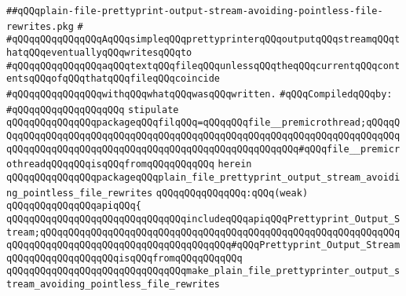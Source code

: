 \label{src/lib/prettyprint/big/src/out/plain-file-prettyprint-output-stream-avoiding-pointless-file-rewrites.pkg}
\verb|##qQQqplain-file-prettyprint-output-stream-avoiding-pointless-file-rewrites.pkg|\newline
\verb|#|\newline
\verb|#qQQqqQQqqQQqqQQqAqQQqsimpleqQQqprettyprinterqQQqoutputqQQqstreamqQQqthatqQQqeventuallyqQQqwritesqQQqto|\newline
\verb|#qQQqqQQqqQQqqQQqaqQQqtextqQQqfileqQQqunlessqQQqtheqQQqcurrentqQQqcontentsqQQqofqQQqthatqQQqfileqQQqcoincide|\newline
\verb|#qQQqqQQqqQQqqQQqwithqQQqwhatqQQqwasqQQqwritten.|\newline
\newline
\verb|#qQQqCompiledqQQqby:|\newline
\verb|#qQQqqQQqqQQqqQQqqQQq|\newline
\newline
\newline
\verb|stipulate|\newline
\verb|qQQqqQQqqQQqqQQqpackageqQQqfilqQQq=qQQqqQQqfile__premicrothread;qQQqqQQqqQQqqQQqqQQqqQQqqQQqqQQqqQQqqQQqqQQqqQQqqQQqqQQqqQQqqQQqqQQqqQQqqQQqqQQqqQQqqQQqqQQqqQQqqQQqqQQqqQQqqQQqqQQqqQQqqQQqqQQq#qQQqfile__premicrothreadqQQqqQQqisqQQqfromqQQqqQQqqQQq|\newline
\verb|herein|\newline
\newline
\verb|qQQqqQQqqQQqqQQqpackageqQQqplain_file_prettyprint_output_stream_avoiding_pointless_file_rewrites|\newline
\verb|qQQqqQQqqQQqqQQq:qQQq(weak)|\newline
\verb|qQQqqQQqqQQqqQQqapiqQQq{|\newline
\verb|qQQqqQQqqQQqqQQqqQQqqQQqqQQqqQQqincludeqQQqapiqQQqPrettyprint_Output_Stream;qQQqqQQqqQQqqQQqqQQqqQQqqQQqqQQqqQQqqQQqqQQqqQQqqQQqqQQqqQQqqQQqqQQqqQQqqQQqqQQqqQQqqQQqqQQqqQQqqQQqqQQq#qQQqPrettyprint_Output_StreamqQQqqQQqqQQqqQQqqQQqisqQQqfromqQQqqQQqqQQq|\newline
\newline
\verb|qQQqqQQqqQQqqQQqqQQqqQQqqQQqqQQqmake_plain_file_prettyprinter_output_stream_avoiding_pointless_file_rewrites|\newline
